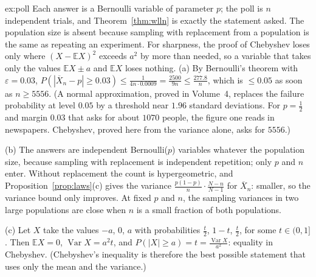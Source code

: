 \begin{solution}{ex:poll}
\idea Each answer is a Bernoulli variable of parameter $p$; the poll is $n$ independent trials, and Theorem~\ref{thm:wlln} is exactly the statement asked. The population size is absent because sampling with replacement from a population is the same as repeating an experiment. For sharpness, the proof of Chebyshev loses only where $(X-\mathbb EX)^2$ exceeds $a^2$ by more than needed, so a variable that takes only the values $\mathbb EX\pm a$ and $\mathbb EX$ loses nothing.
\writeup (a) By Bernoulli's theorem with $\varepsilon=0.03$, $P(|\overline X_n-p|\ge0.03)\le\frac1{4n\cdot0.0009}=\frac{2500}{9n}\le\frac{277.8}n$, which is $\le0.05$ as soon as $n\ge5556$. (A normal approximation, proved in Volume~4, replaces the failure probability at level $0.05$ by a threshold near $1.96$ standard deviations. For $p=\frac12$ and margin $0.03$ that asks for about $1070$ people, the figure one reads in newspapers. Chebyshev, proved here from the variance alone, asks for $5556$.)

(b) The answers are independent Bernoulli($p$) variables whatever the population size, because sampling with replacement is independent repetition; only $p$ and $n$ enter. Without replacement the count is hypergeometric, and Proposition~\ref{prop:laws}(c) gives the variance $\frac{p(1-p)}n\cdot\frac{N-n}{N-1}$ for $\overline X_n$: smaller, so the variance bound only improves. At fixed $p$ and $n$, the sampling variances in two large populations are close when $n$ is a small fraction of both populations.

(c) Let $X$ take the values $-a$, $0$, $a$ with probabilities $\frac t2$, $1-t$, $\frac t2$, for some $t\in(0,1]$. Then $\mathbb EX=0$, $\operatorname{Var}X=a^2t$, and $P(|X|\ge a)=t=\frac{\operatorname{Var}X}{a^2}$: equality in Chebyshev. (Chebyshev's inequality is therefore the best possible statement that uses only the mean and the variance.)
\end{solution}

